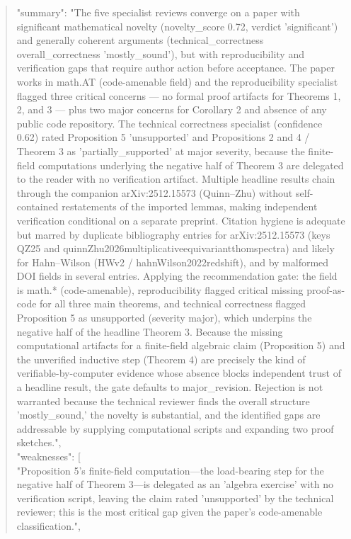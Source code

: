 \documentclass[11pt]{article}
\begin{document}
\begin{quote}
  "summary": "The five specialist reviews converge on a paper with significant mathematical novelty (novelty\_score 0.72, verdict 'significant') and generally coherent arguments (technical\_correctness overall\_correctness 'mostly\_sound'), but with reproducibility and verification gaps that require author action before acceptance. The paper works in math.AT (code-amenable field) and the reproducibility specialist flagged three critical concerns --- no formal proof artifacts for Theorems 1, 2, and 3 --- plus two major concerns for Corollary 2 and absence of any public code repository. The technical correctness specialist (confidence 0.62) rated Proposition 5 'unsupported' and Propositions 2 and 4 / Theorem 3 as 'partially\_supported' at major severity, because the finite-field computations underlying the negative half of Theorem 3 are delegated to the reader with no verification artifact. Multiple headline results chain through the companion arXiv:2512.15573 (Quinn--Zhu) without self-contained restatements of the imported lemmas, making independent verification conditional on a separate preprint. Citation hygiene is adequate but marred by duplicate bibliography entries for arXiv:2512.15573 (keys QZ25 and quinnZhu2026multiplicativeequivariantthomspectra) and likely for Hahn--Wilson (HWv2 / hahnWilson2022redshift), and by malformed DOI fields in several entries. Applying the recommendation gate: the field is math.* (code-amenable), reproducibility flagged critical missing proof-as-code for all three main theorems, and technical correctness flagged Proposition 5 as unsupported (severity major), which underpins the negative half of the headline Theorem 3. Because the missing computational artifacts for a finite-field algebraic claim (Proposition 5) and the unverified inductive step (Theorem 4) are precisely the kind of verifiable-by-computer evidence whose absence blocks independent trust of a headline result, the gate defaults to major\_revision. Rejection is not warranted because the technical reviewer finds the overall structure 'mostly\_sound,' the novelty is substantial, and the identified gaps are addressable by supplying computational scripts and expanding two proof sketches.",\\
  "weaknesses": [\\
    "Proposition 5's finite-field computation---the load-bearing step for the negative half of Theorem 3---is delegated as an 'algebra exercise' with no verification script, leaving the claim rated 'unsupported' by the technical reviewer; this is the most critical gap given the paper's code-amenable classification.",\\

\end{quote}
\end{document}
